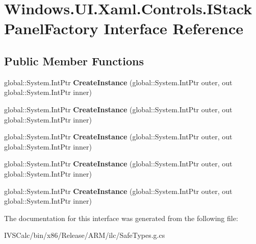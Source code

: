 \hypertarget{interface_windows_1_1_u_i_1_1_xaml_1_1_controls_1_1_i_stack_panel_factory}{}\section{Windows.\+U\+I.\+Xaml.\+Controls.\+I\+Stack\+Panel\+Factory Interface Reference}
\label{interface_windows_1_1_u_i_1_1_xaml_1_1_controls_1_1_i_stack_panel_factory}
\subsection*{Public Member Functions}
\begin{DoxyCompactItemize}
\item 
\mbox{\label{interface_windows_1_1_u_i_1_1_xaml_1_1_controls_1_1_i_stack_panel_factory_a90f406e4a923284f256ff01474d57987}} 
global\+::\+System.\+Int\+Ptr {\bfseries Create\+Instance} (global\+::\+System.\+Int\+Ptr outer, out global\+::\+System.\+Int\+Ptr inner)
\item 
\mbox{\label{interface_windows_1_1_u_i_1_1_xaml_1_1_controls_1_1_i_stack_panel_factory_a90f406e4a923284f256ff01474d57987}} 
global\+::\+System.\+Int\+Ptr {\bfseries Create\+Instance} (global\+::\+System.\+Int\+Ptr outer, out global\+::\+System.\+Int\+Ptr inner)
\item 
\mbox{\label{interface_windows_1_1_u_i_1_1_xaml_1_1_controls_1_1_i_stack_panel_factory_a90f406e4a923284f256ff01474d57987}} 
global\+::\+System.\+Int\+Ptr {\bfseries Create\+Instance} (global\+::\+System.\+Int\+Ptr outer, out global\+::\+System.\+Int\+Ptr inner)
\item 
\mbox{\label{interface_windows_1_1_u_i_1_1_xaml_1_1_controls_1_1_i_stack_panel_factory_a90f406e4a923284f256ff01474d57987}} 
global\+::\+System.\+Int\+Ptr {\bfseries Create\+Instance} (global\+::\+System.\+Int\+Ptr outer, out global\+::\+System.\+Int\+Ptr inner)
\item 
\mbox{\label{interface_windows_1_1_u_i_1_1_xaml_1_1_controls_1_1_i_stack_panel_factory_a90f406e4a923284f256ff01474d57987}} 
global\+::\+System.\+Int\+Ptr {\bfseries Create\+Instance} (global\+::\+System.\+Int\+Ptr outer, out global\+::\+System.\+Int\+Ptr inner)
\end{DoxyCompactItemize}


The documentation for this interface was generated from the following file\+:\begin{DoxyCompactItemize}
\item 
I\+V\+S\+Calc/bin/x86/\+Release/\+A\+R\+M/ilc/Safe\+Types.\+g.\+cs\end{DoxyCompactItemize}
